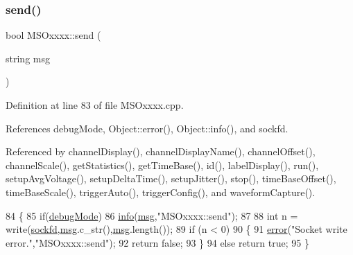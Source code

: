 \subsubsection{\texorpdfstring{send()}{send()}}
{\footnotesize\ttfamily bool M\+S\+Oxxxx\+::send (\begin{DoxyParamCaption}\item[{string}]{msg }\end{DoxyParamCaption})\hspace{0.3cm}{\ttfamily [private]}}



Definition at line 83 of file M\+S\+Oxxxx.\+cpp.



References debug\+Mode, Object\+::error(), Object\+::info(), and sockfd.



Referenced by channel\+Display(), channel\+Display\+Name(), channel\+Offset(), channel\+Scale(), get\+Statistics(), get\+Time\+Base(), id(), label\+Display(), run(), setup\+Avg\+Voltage(), setup\+Delta\+Time(), setup\+Jitter(), stop(), time\+Base\+Offset(), time\+Base\+Scale(), trigger\+Auto(), trigger\+Config(), and waveform\+Capture().


\begin{DoxyCode}
84 \{
85     \textcolor{keywordflow}{if}(\hyperlink{classMSOxxxx_a826ba82e93bbe5780169107a31dbfd29}{debugMode})
86         \hyperlink{classObject_a644fd329ea4cb85f54fa6846484b84a8}{info}(\hyperlink{classObject_a58b2d0618c2d08cf2383012611528d97}{msg},\textcolor{stringliteral}{"MSOxxxx::send"});
87 
88     \textcolor{keywordtype}{int} n = write(\hyperlink{classMSOxxxx_acf030a8f1ddd78d632816c856f50455c}{sockfd},\hyperlink{classObject_a58b2d0618c2d08cf2383012611528d97}{msg}.c\_str(),\hyperlink{classObject_a58b2d0618c2d08cf2383012611528d97}{msg}.length());
89     \textcolor{keywordflow}{if} (n < 0)
90     \{
91         \hyperlink{classObject_a204a95f57818c0f811933917a30eff45}{error}(\textcolor{stringliteral}{"Socket write error."},\textcolor{stringliteral}{"MSOxxxx::send"});
92         \textcolor{keywordflow}{return} \textcolor{keyword}{false};
93     \}
94     \textcolor{keywordflow}{else} \textcolor{keywordflow}{return} \textcolor{keyword}{true};
95 \}
\end{DoxyCode}
\mbox{\label{classElement_ab476b4b1df5954141ceb14f072433b89}} 
